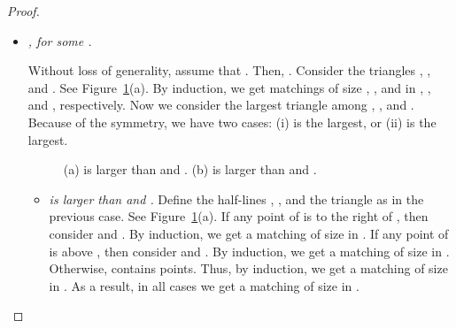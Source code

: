 \documentclass[11pt,a4paper]{article}
\begin{document}
\begin{proof}
\begin{itemize}
\begin{itemize}
 \item {\em Some elements of  are greater than zero.} Consider the triangles , , and . Note that the area of some of these triangles\textemdash but not all\textemdash may be equal to zero. See Figure~\ref{Theta-six-fig}(b). By induction, we get matchings of size , , and  in , , and , respectively. Without loss of generality, assume , is larger than  and . Consider the half-lines  and  which are parallel to  and  axis, and have their endpoints on the top corner and right corner of , respectively. We define  as the downward equilateral-triangle which is bounded by , , and the right side of ; the dashed triangle in Figure~\ref{Theta-six-fig}(b). Note that  and  do not intersect  and . In addition, , , , and  are pairwise disjoint. If any point of  is to the right of , then consider  and . By induction, we get a matching of size  in , and hence a matching of size  in . If any point of  is above , then consider  and . By induction, we get a matching of size  in , and hence a matching of size  in . Otherwise,  contains  points. Thus, by induction, we get a matching of size  in , and hence a matching of size  in .
\end{itemize}


\item {\em , for some .}

Without loss of generality, assume that . Then, . Consider the triangles , , and . See Figure~\ref{Theta-six-fig2}(a). By induction, we get matchings of size , , and  in , , and , respectively. 
Now we consider the largest triangle among , , and . Because of the symmetry, we have two cases: (i)  is the largest, or (ii)  is the largest.
\begin{figure}[h!]
  \centering
\setlength{\tabcolsep}{0in}
  
  \caption{(a)  is larger than  and . (b)  is larger than  and .}
\label{Theta-six-fig2}
\end{figure}
\begin{itemize}
 \item {\em  is larger than  and .}
Define the half-lines , , and the triangle  as in the previous case. See Figure~\ref{Theta-six-fig2}(a). If any point of  is to the right of , then consider  and . By induction, we get a matching of size  in . If any point of  is above , then consider  and . By induction, we get a matching of size  in . Otherwise,  contains  points. Thus, by induction, we get a matching of size  in . As a result, in all cases we get a matching of size  in .


\end{itemize}
\end{itemize}
\end{proof}
\end{document}
